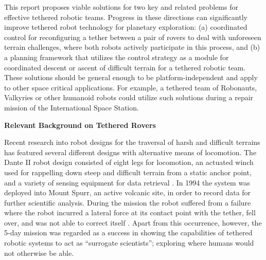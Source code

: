 \documentclass[12pt]{article}
\begin{document}
 This report proposes viable solutions for
two key and related problems for effective tethered robotic teams.
Progress in these directions can significantly improve tethered robot 
technology for
planetary exploration: (a) coordinated control for reconfiguring a
tether between a pair of rovers to deal with unforeseen terrain
challenges, where both robots actively participate in this process,
and (b) a planning framework that utilizes the control strategy as a
module for coordinated descent or ascent of difficult terrain for a
tethered robotic team.  These solutions should be general enough to
be platform-independent and apply to other space critical
applications. For example, a tethered team of Robonauts, Valkyries or
other humanoid robots could utilize such solutions during a repair
mission of the International Space Station.


{\bf\noindent Relevant Background on Tethered Rovers}

Recent research into robot designs for the traversal of harsh and difficult terrains has
featured several different designs with alternative means of locomotion. The Dante II robot
design consisted of eight legs for locomotion, an actuated winch used for rappelling down
steep and difficult terrain from a static anchor point, and a variety of sensing equipment for
data retrieval \cite{dante_design}. In 1994 the system was deployed into Mount Spurr, an active volcanic site,
in order to record data for further scientific analysis. During the mission the robot suffered
from a failure where the robot incurred a lateral force at its contact point with the tether, fell
over, and was not able to correct itself \cite{dante_results}. Apart from this occurrence, however, the 5-day
mission was regarded as a success in showing the capabilities of tethered robotic systems to
act as ``surrogate scientists''; exploring where humans would not otherwise be able.
\end{document}
